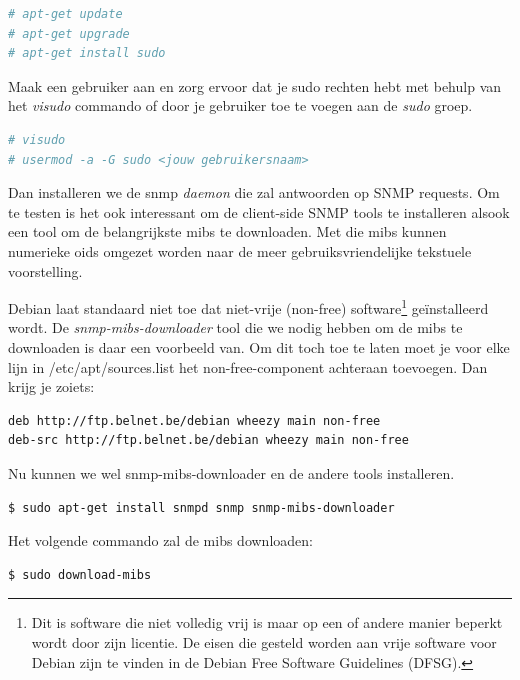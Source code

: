 \begin{lstlisting}[language=bash]
# apt-get update
# apt-get upgrade
# apt-get install sudo
\end{lstlisting}

Maak een gebruiker aan en zorg ervoor dat je sudo rechten hebt met behulp van het \textit{visudo} commando of door je gebruiker toe te voegen aan de \textit{sudo} groep.

\begin{lstlisting}[language=bash]
# visudo
# usermod -a -G sudo <jouw gebruikersnaam>
\end{lstlisting}

Dan installeren we de snmp \textit{daemon} die zal antwoorden op SNMP requests.
Om te testen is het ook interessant om de client-side SNMP tools te installeren alsook een tool om de belangrijkste \glspl{mib} te downloaden.
Met die \glspl{mib} kunnen numerieke \glspl{oid} omgezet worden naar de meer gebruiksvriendelijke tekstuele voorstelling.

Debian laat standaard niet toe dat niet-vrije (non-free) software\footnote{
	Dit is software die niet volledig vrij is maar op een of andere manier beperkt wordt door zijn licentie. De eisen die gesteld worden aan vrije software voor Debian zijn te vinden in de Debian Free Software Guidelines (DFSG)\cite{dfsg}\cite{dfsg-wiki}.}
geïnstalleerd wordt. De \textit{snmp-mibs-downloader} tool die we nodig hebben om de \glspl{mib} te downloaden is daar een voorbeeld van.
Om dit toch toe te laten moet je voor elke lijn in /etc/apt/sources.list het non-free-component achteraan toevoegen.
Dan krijg je zoiets:

\begin{lstlisting}[language=bash]
deb http://ftp.belnet.be/debian wheezy main non-free
deb-src http://ftp.belnet.be/debian wheezy main non-free
\end{lstlisting}

Nu kunnen we wel snmp-mibs-downloader en de andere tools installeren.

\begin{lstlisting}[language=bash]
$ sudo apt-get install snmpd snmp snmp-mibs-downloader
\end{lstlisting}

Het volgende commando zal de \glspl{mib} downloaden:

\begin{lstlisting}[language=bash]
$ sudo download-mibs
\end{lstlisting}

